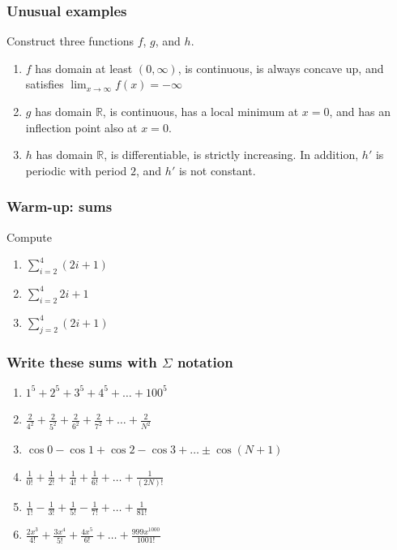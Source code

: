 \begin{frame}[t]
	\frametitle{Unusual examples}

	Construct three functions $f$, $g$, and $h$.

	\begin{enumerate}
		\item $f$ has domain at least $(0,\infty)$, is continuous, is always concave
			up, and satisfies $\displaystyle \lim_{x \to \infty}f(x) = - \infty$

		\item $g$ has domain $\mathbb{R}$, is continuous, has a local minimum at $x=0$,
			and has an inflection point also at $x=0$.

		\item $h$ has domain $\mathbb{R}$, is differentiable, is strictly increasing.
			In addition, $h'$ is periodic with period $2$, and $h'$ is not constant.
	\end{enumerate}
\end{frame}

\begin{frame}[t]
	\frametitle{Warm-up: sums}

	Compute

	\begin{enumerate}
		\item $\displaystyle \sum_{i=2}^{4}(2i+1)$
			\vfill

		\item $\displaystyle \sum_{i=2}^{4}2i + 1$
			\vfill

		\item $\displaystyle \sum_{j=2}^{4}(2i + 1)$
			\vfill
	\end{enumerate}
\end{frame}

\begin{frame}[t]
	\fontsize{13}{13}\selectfont
	\frametitle{Write these sums with $\Sigma$ notation}

	\begin{enumerate}
		\item $\displaystyle 1^{5}+ 2^{5}+ 3^{5}+ 4^{5}+ \ldots + 100^{5}$
			\vfill

		\item $\displaystyle \frac{2}{4^{2}}+ \frac{2}{5^{2}}+ \frac{2}{6^{2}}+ \frac{2}{7^{2}}
			+ \ldots + \frac{2}{N^{2}}$
			\vfill

		\item $\displaystyle \cos 0 - \cos 1 + \cos 2 - \cos 3 + %
			\ldots \pm \cos (N+1)$
			\vfill

		\item $\displaystyle \frac{1}{0!}+ \frac{1}{2!}+ \frac{1}{4!}+ \frac{1}{6!}+
			\ldots + \frac{1}{(2N)!}$
			\vfill

		\item $\displaystyle \frac{1}{1!}- \frac{1}{3!}+ \frac{1}{5!}- \frac{1}{7!}+
			\ldots + \frac{1}{81!}$
			\vfill

		\item $\displaystyle \frac{2x^{3}}{ 4!}+ \frac{3x^{4}}{5!}+ \frac{4x^{5}}{6!}
			+ \ldots + \frac{999x^{1000}}{1001!}$
	\end{enumerate}
\end{frame}

